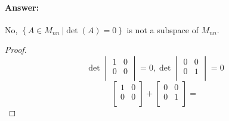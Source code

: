 \documentclass[12pt]{article}
\begin{document}
\begin{enumerate}
\begin{enumerate}
                            \paragraph{Answer:} No, ${ \left\{A \in M_{nn} \
                                                    | \det (A) = 0 \right\}}$ is not a subspace of $M_{nn}$.
                            \begin{proof}
                                    \begin{equation*}
                                            \det
                                            \begin{vmatrix}
                                                    {1} & {0} \\
                                                    {0} & {0} \\
                                            \end{vmatrix}
                                            {= 0},
                                            \det
                                            \begin{vmatrix}
                                                    {0} & {0} \\
                                                    {0} & {1} \\
                                            \end{vmatrix}
                                            = 0
                                    \end{equation*}
                                    \begin{equation*}
                                            \begin{bmatrix}
                                                    {1} & {0} \\
                                                    {0} & {0} \\
                                            \end{bmatrix}
                                            +
                                            \begin{bmatrix}
                                                    {0} & {0} \\
                                                    {0} & {1} \\
                                            \end{bmatrix}
                                            =

\end{equation*}
\end{proof}
\end{enumerate}
\end{enumerate}
\end{document}

